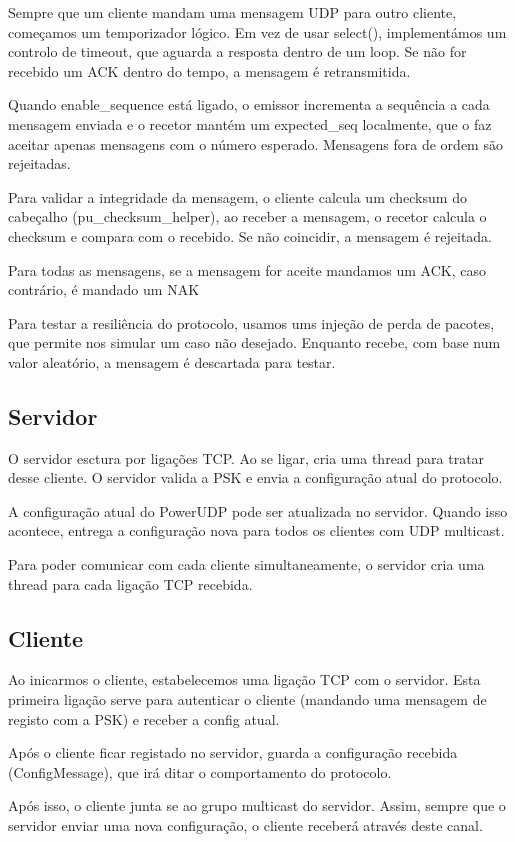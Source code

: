\documentclass[a4paper, 11pt]{article}
\begin{document}
Sempre que um cliente mandam uma mensagem UDP para outro cliente, começamos um temporizador lógico. Em vez de usar select(), implementámos um controlo de timeout, que aguarda a resposta dentro de um loop. Se não for recebido um ACK dentro do tempo, a mensagem é retransmitida.

Quando enable\_sequence está ligado, o emissor incrementa a sequência a cada mensagem enviada e o recetor mantém um expected\_seq localmente, que o faz aceitar apenas mensagens com o número esperado. Mensagens fora de ordem são rejeitadas.

Para validar a integridade da mensagem, o cliente calcula um checksum do cabeçalho (pu\_checksum\_helper), ao receber a mensagem, o recetor calcula o checksum e compara com o recebido. Se não coincidir, a mensagem é rejeitada.

Para todas as mensagens, se a mensagem for aceite mandamos um ACK, caso contrário, é mandado um NAK

Para testar a resiliência do protocolo, usamos ums injeção de perda de pacotes, que permite nos simular um caso não desejado. Enquanto recebe, com base num valor aleatório, a mensagem é descartada para testar.
\subsection{Servidor}
O servidor esctura por ligações TCP. Ao se ligar, cria uma thread para tratar desse cliente. O servidor valida a PSK e envia a configuração atual do protocolo.

A configuração atual do PowerUDP pode ser atualizada no servidor. Quando isso acontece, entrega a configuração nova para todos os clientes com UDP multicast.

Para poder comunicar com cada cliente simultaneamente, o servidor cria uma thread para cada ligação TCP recebida.
\subsection{Cliente}
Ao inicarmos o cliente, estabelecemos uma ligação TCP com o servidor. Esta primeira ligação serve para autenticar o cliente (mandando uma mensagem de registo com a PSK) e receber a config atual. 

Após o cliente ficar registado no servidor, guarda a configuração recebida (ConfigMessage), que irá ditar o comportamento do protocolo.

Após isso, o cliente junta se ao grupo multicast do servidor. Assim, sempre que o servidor enviar uma nova configuração, o cliente receberá através deste canal.
\end{document}
